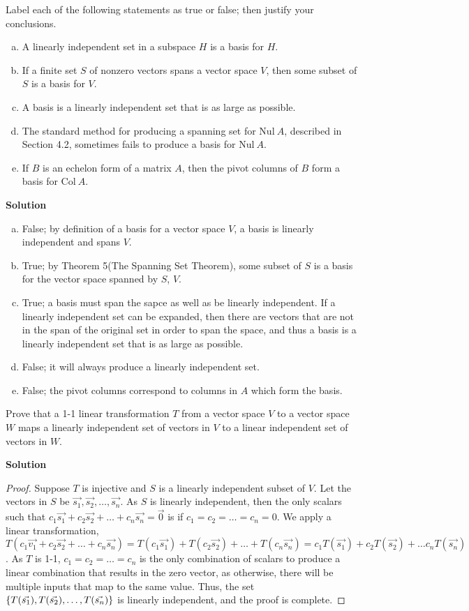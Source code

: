 \documentclass[11pt]{scrartcl}
\theoremstyle{dotlessP}
\theoremstyle{dotlessN}
\DeclarePairedDelimiter\set{\{}{\}}
\newcommand{\nul}{\text{Nul}}
\newcommand{\col}{\text{Col}}
\begin{document}
\begin{ques}
	Label each of the following statements as true or false; then justify your conclusions.
	\begin{enumerate}[a.]
		\item A linearly independent set in a subspace $H$ is a basis for $H$.
		\item If a finite set $S$ of nonzero vectors spans a vector space $V$, then some subset of $S$ is a basis for $V$.
		\item A basis is a linearly independent set that is as large as possible.
		\item The standard method for producing a spanning set for  $\nul \ A$, described in Section 4.2, sometimes fails to produce a basis for $\nul \ A$.
		\item If $B$ is an echelon form of a matrix $A$, then the pivot columns of $B$ form a basis for $\col \ A$.
	\end{enumerate}
\end{ques}
\textbf{Solution}
\begin{enumerate}[a.]
	\item False; by definition of a basis for a vector space $V$, a basis is linearly independent and spans $V$.
	\item True; by Theorem 5(The Spanning Set Theorem), some subset of $S$ is a basis for the vector space spanned by $S$, $V$.
	\item True; a basis must span the sapce as well as be linearly independent. If a linearly independent set can be expanded, then there are vectors that are not in the span of the original set in order to span the space, and thus a basis is a linearly independent set that is as large as possible.
	\item False; it will always produce a linearly independent set.
	\item False; the pivot columns correspond to columns in $A$ which form the basis.
\end{enumerate}
\begin{ques}
	Prove that a 1-1 linear transformation $T$ from a vector space $V$ to a vector space $W$ maps a linearly independent set of vectors in  $V$ to a linear independent set of vectors in $W$.
\end{ques}
\textbf{Solution}
	\begin{proof}
		Suppose $T$ is injective and $S$ is a linearly independent subset of $V$. Let the vectors in $S$ be $\vec{s_1}, \vec{s_2}, \dots, \vec{s_n}$. As $S$ is linearly independent, then the only scalars such that $c_1\vec{s_1} + c_2 \vec{s_2} + \dots + c_n \vec{s_n} = \vec{0}$ is if $c_1 = c_2 = \dots = c_n = 0$. We apply a linear transformation, $T(c_1\vec{v_1} + c_2 \vec{s_2} + \dots + c_n \vec{s_n}) = T(c_1 \vec{s_1}) + T(c_2 \vec{s_2}) + \dots + T(c_n \vec{s_n}) = c_1T(\vec{s_1}) + c_2T(\vec{s_2}) + \dots c_nT(\vec{s_n})$. As $T$ is 1-1, $c_1 = c_2 = \dots = c_n$ is the only combination of scalars to produce a linear combination that results in the zero vector, as otherwise, there will be multiple inputs that map to the same value. Thus, the set $\set*{T(\vec{s_1}), T(\vec{s_2}), \dots , T(\vec{s_n})}$ is linearly independent, and the proof is complete.
	\end{proof}
\end{document}

